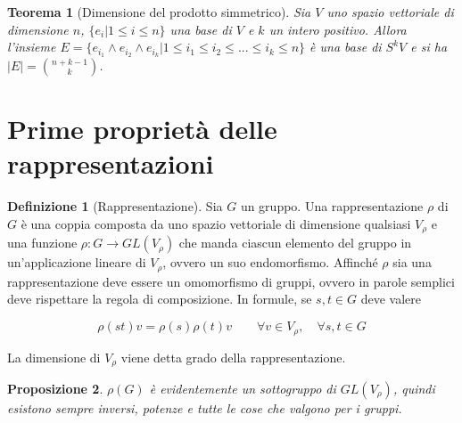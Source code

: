\documentclass[11pt]{article}
\theoremstyle{plain}
\newtheorem{thm}{Teorema}[section]
\newtheorem{prop}[thm]{Proposizione}
\theoremstyle{definition}
\newtheorem{defn}{Definizione}[section]
\theoremstyle{remark}
\begin{document}
\begin{thm}[Dimensione del prodotto simmetrico]

Sia $V$ uno spazio vettoriale di dimensione $n$, $\{e_i| 1 \leq i \leq n\}$ una base di $V$ e $k$ un intero positivo.
Allora l'insieme $E=\{e_{i_1} \wedge e_{i_2} \wedge e_{i_k}| 1 \leq i_1 \leq i_2 \leq...\leq i_k \leq n\}$ è una base di $S^k V$ 
e si ha $|E|= \binom {n+k-1}{k}$.

\label{thm:prodotto simmetrico}
\end{thm}




















\newpage
\section{Prime proprietà delle rappresentazioni}

\begin{defn}[Rappresentazione] Sia $G$ un gruppo. Una rappresentazione $\rho$ di $G$ è una coppia composta da uno spazio vettoriale di dimensione qualsiasi $V_\rho$ e una funzione $\rho: G \to GL(V_\rho)$ che manda ciascun elemento del gruppo in un'applicazione lineare di $V_\rho$, ovvero un suo endomorfismo. Affinché $\rho$ sia una rappresentazione deve essere un omomorfismo di gruppi, ovvero in parole semplici deve rispettare la regola di composizione. In formule, se $s, t \in G$ deve valere

\[ \rho(st) v = \rho(s)\rho(t) v \qquad \forall v \in V_\rho, \quad \forall s,t \in G\]

La dimensione di $V_\rho$ viene detta grado della rappresentazione.

\end{defn}

\begin{prop} $\rho(G)$ è evidentemente un sottogruppo di $GL(V_\rho)$, quindi esistono sempre inversi, potenze e tutte le cose che valgono per i gruppi.

\end{prop}
\end{document}
